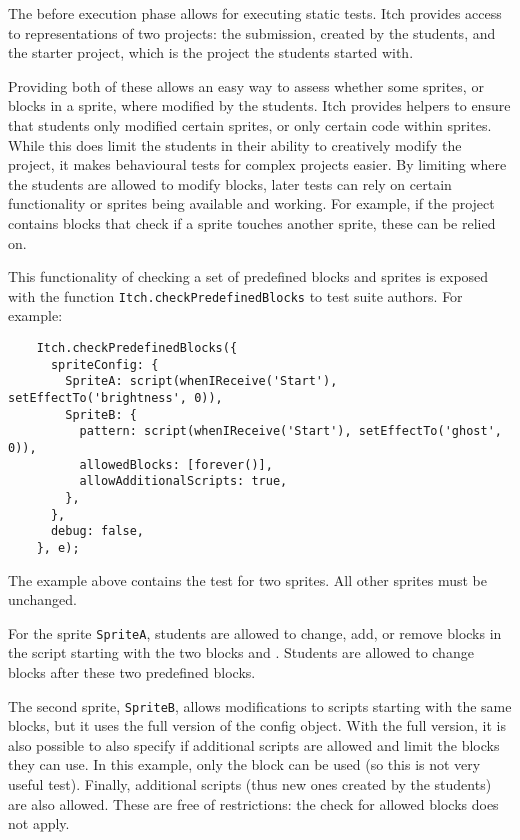 \documentclass[../main]{subfiles}
\begin{document}
The before execution phase allows for executing static tests.
Itch provides access to representations of two projects: the submission, created by the students, and the starter project, which is the project the students started with.

Providing both of these allows an easy way to assess whether some sprites, or blocks in a sprite, where modified by the students.
Itch provides helpers to ensure that students only modified certain sprites, or only certain code within sprites.
While this does limit the students in their ability to creatively modify the project, it makes behavioural tests for complex projects easier.
By limiting where the students are allowed to modify blocks, later tests can rely on certain functionality or sprites being available and working.
For example, if the project contains blocks that check if a sprite touches another sprite, these can be relied on.

This functionality of checking a set of predefined blocks and sprites is exposed with the function \texttt{Itch.checkPredefinedBlocks} to test suite authors.
For example:

\begin{verbatim}
    Itch.checkPredefinedBlocks({
      spriteConfig: {
        SpriteA: script(whenIReceive('Start'), setEffectTo('brightness', 0)),
        SpriteB: {
          pattern: script(whenIReceive('Start'), setEffectTo('ghost', 0)),
          allowedBlocks: [forever()],
          allowAdditionalScripts: true,
        },
      },
      debug: false,
    }, e);
\end{verbatim}

The example above contains the test for two sprites.
All other sprites must be unchanged.

For the sprite \texttt{SpriteA}, students are allowed to change, add, or remove blocks in the script starting with the two blocks  and .
Students are allowed to change blocks after these two predefined blocks.

The second sprite, \texttt{SpriteB}, allows modifications to scripts starting with the same blocks, but it uses the full version of the config object.
With the full version, it is also possible to also specify if additional scripts are allowed and limit the blocks they can use.
In this example, only the  block can be used (so this is not very useful test).
Finally, additional scripts (thus new ones created by the students) are also allowed.
These are free of restrictions: the check for allowed blocks does not apply.
\end{document}
